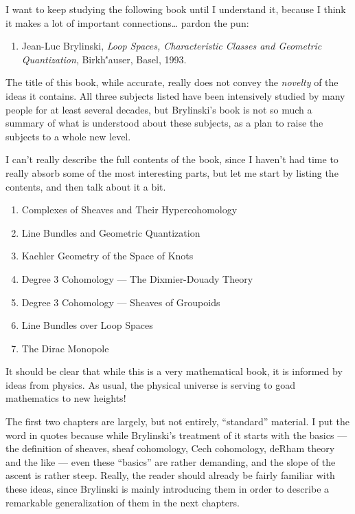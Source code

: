 \documentclass{article}
\def\tightlist{}
\begin{document}
I want to keep studying the following book until I understand it,
because I think it makes a lot of important connections\ldots{} pardon
the pun:

\begin{enumerate}
\def\labelenumi{\arabic{enumi})}
\tightlist
\item
   Jean-Luc Brylinski, \emph{Loop Spaces, Characteristic Classes and Geometric Quantization},
  Birkh\''auser, Basel, 1993.
\end{enumerate}

The title of this book, while accurate, really does not convey the
\emph{novelty} of the ideas it contains. All three subjects listed have
been intensively studied by many people for at least several decades,
but Brylinski's book is not so much a summary of what is understood
about these subjects, as a plan to raise the subjects to a whole new
level.

I can't really describe the full contents of the book, since I haven't
had time to really absorb some of the most interesting parts, but let me
start by listing the contents, and then talk about it a bit.

\begin{enumerate}
\def\labelenumi{\arabic{enumi}.}
\tightlist
\item
  Complexes of Sheaves and Their Hypercohomology
\item
  Line Bundles and Geometric Quantization
\item
  Kaehler Geometry of the Space of Knots
\item
  Degree 3 Cohomology --- The Dixmier-Douady Theory
\item
  Degree 3 Cohomology --- Sheaves of Groupoids
\item
  Line Bundles over Loop Spaces
\item
  The Dirac Monopole
\end{enumerate}
\noindent
It should be clear that while this is a very mathematical book, it is
informed by ideas from physics. As usual, the physical universe is
serving to goad mathematics to new heights!

The first two chapters are largely, but not entirely, ``standard''
material. I put the word in quotes because while Brylinski's treatment
of it starts with the basics --- the definition of sheaves, sheaf
cohomology, Cech cohomology, deRham theory and the like --- even these
``basics'' are rather demanding, and the slope of the ascent is rather
steep. Really, the reader should already be fairly familiar with these
ideas, since Brylinski is mainly introducing them in order to describe a
remarkable generalization of them in the next chapters.
\end{document}
